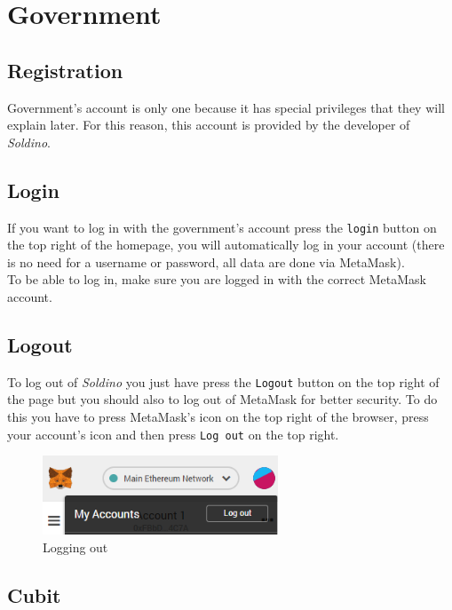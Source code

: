 \section{Government}
	\subsection{Registration}
	Government's account is only one because it has special privileges that
	they will explain later. For this reason, this account is provided 
	by the developer of \textit{Soldino}.
	\subsection{Login}
	If you want to log in with the government's account press the \texttt{login} button on the 
	top right of the homepage, you will automatically log in your account 
	(there is no need for a username or password, all data are done via MetaMask). 
	\\To be able to log in, make sure you are logged in with the correct MetaMask\glosp 
	account.
	\subsection{Logout}

	To log out of \textit{Soldino} you just have press the \texttt{Logout} button on 
	the top right of the page but you should also to log out of MetaMask\glosp{} 
	for better security. To do this you have to press MetaMask's icon on the top 
	right of the browser, press your account's icon and then press \texttt{Log out}
	on the top right.
	\begin{figure}[H]
		\includegraphics[width=7cm]{res/images/logout_metamask.png}
		\centering
		\caption{Logging out}
	\end{figure}
\pagebreak
	\subsection{Cubit}

